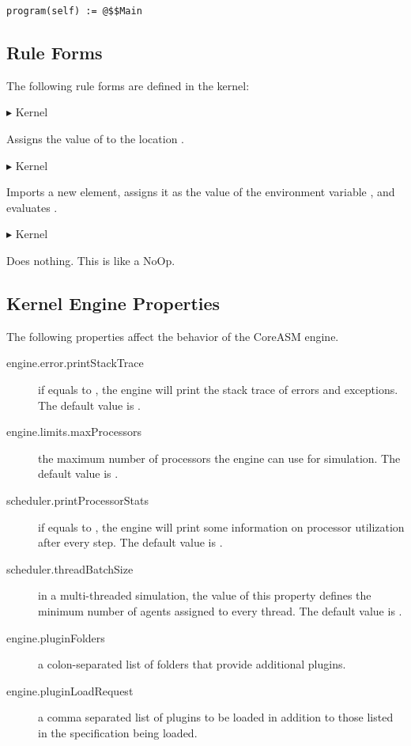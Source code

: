 \documentclass{article}
\makeatletter
\newcommand{\CoreASM}{{\sffamily CoreASM}\xspace}
\newcommand{\ruleform}[2]{\pform{$\blacktriangleright$}{#1}{#2}}
\newcommand{\pform}[3]{\vspace*{4mm} \noindent #1 #2 \vspace{1mm}\textcolor[gray]{0.7}{\dotfill}\mbox{{\sffamily \footnotesize #3}}}
\newcommand{\indexrule}[1]{\index{#1 rule@\asm{#1} rule}}
\makeatother
\begin{document}
\begin{lstlisting}
program(self) := @$$Main
\end{lstlisting}

\subsection{Rule Forms}

The following rule forms are defined in the kernel:

\ruleform{}{Kernel}

Assigns the value of  to the location .

\ruleform{}{Kernel}

Imports a new element, assigns it as the value of the environment variable ,
and evaluates .

\ruleform{}{Kernel}\indexrule{skip}

Does nothing. This is like a NoOp.
  

\subsection{Kernel Engine Properties}

The following properties affect the behavior of the \CoreASM engine. 

\begin{description}
	\item[engine.error.printStackTrace] if equals to , the engine will 
		print the stack trace of errors and exceptions. The default value is . 

	\item[engine.limits.maxProcessors] the maximum number of processors the engine 
		can use for simulation. The default value is . 

	\item[scheduler.printProcessorStats] if equals to , the engine 
		will print some information on processor utilization after every step. The default value is . 

	\item[scheduler.threadBatchSize] in a multi-threaded simulation, the value
		of this property defines the minimum number of agents assigned to every thread.
	The default value is .
	
	\item[engine.pluginFolders] a colon-separated list of folders that provide additional plugins. 

	\item[engine.pluginLoadRequest] a comma separated list of plugins to be loaded in addition to those listed in the specification being loaded.
\end{description}
\end{document}
